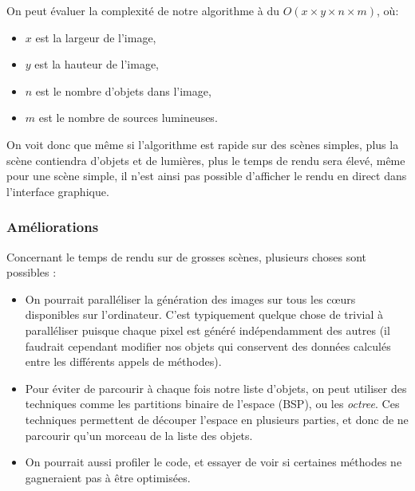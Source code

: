 \documentclass[a4paper]{article}
\begin{document}
    On peut évaluer la complexité de notre algorithme à du
    $O(x\times y\times n\times m)$, où:
    \begin{itemize}
        \item $x$ est la largeur de l'image,
        \item $y$ est la hauteur de l'image,
        \item $n$ est le nombre d'objets dans l'image,
        \item $m$ est le nombre de sources lumineuses.
    \end{itemize}
    On voit donc que même si l'algorithme est rapide sur des scènes simples,
    plus la scène contiendra d'objets et de lumières, plus le temps de rendu
    sera élevé, même pour une scène simple, il n'est ainsi pas possible
    d'afficher le rendu en direct dans l'interface graphique.
    \subsubsection{Améliorations}
    Concernant le temps de rendu sur de grosses scènes, plusieurs choses sont possibles :
    \begin{itemize}
        \item On pourrait paralléliser la génération des images sur tous les
          cœurs disponibles sur l'ordinateur. C'est typiquement quelque chose de
          trivial à paralléliser puisque chaque pixel est généré indépendamment
          des autres (il faudrait cependant modifier nos objets qui conservent
          des données calculés entre les différents appels de méthodes).
        \item Pour éviter de parcourir à chaque fois notre liste d'objets, on peut utiliser des techniques
             comme les partitions binaire de l'espace (BSP), ou les \textit{octree}.
             Ces techniques permettent de découper l'espace en plusieurs parties, 
             et donc de ne parcourir qu'un morceau de la liste des objets.
             
        \item On pourrait aussi profiler le code, et essayer de voir si
          certaines méthodes ne gagneraient pas à être optimisées.
    \end{itemize}
    
\end{document}
